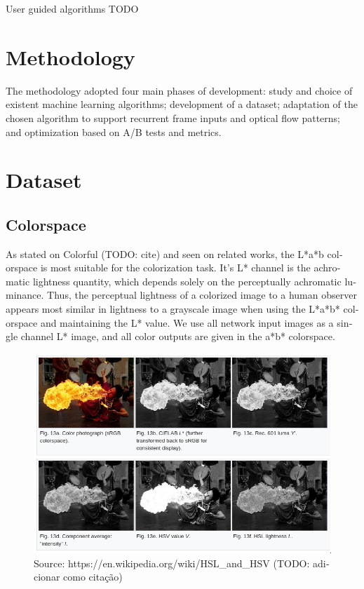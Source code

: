 \documentclass[12pt,openright,twoside,a4paper,english]{abntex2}
\begin{document}
\begin{otherlanguage}{english}
User guided algorithms TODO

\section{Methodology}
The methodology adopted four main phases of development: study and choice of existent machine learning algorithms; development of a dataset; adaptation of the chosen algorithm to support recurrent frame inputs and optical flow patterns; and optimization based on A/B tests and metrics.


\section{Dataset}
\subsection{Colorspace}
As stated on Colorful (TODO: cite) and seen on related works, the L*a*b colorspace is most suitable for the colorization task. It's L* channel is the achromatic lightness quantity, which depends solely on the perceptually achromatic luminance. Thus, the perceptual lightness of a colorized image to a human observer appears most similar in lightness to a grayscale image when using the L*a*b* colorspace and maintaining the L* value. We use all network input images as a single channel L* image, and all color outputs are given in the a*b* colorspace.

\begin{figure}[!htb]
\centering
\includegraphics[width=\textwidth]{Colorspaces}
\caption{Source: https://en.wikipedia.org/wiki/HSL\_and\_HSV (TODO: adicionar como citação)}
\label{Label}
\end{figure}


\end{otherlanguage}
\end{document}
